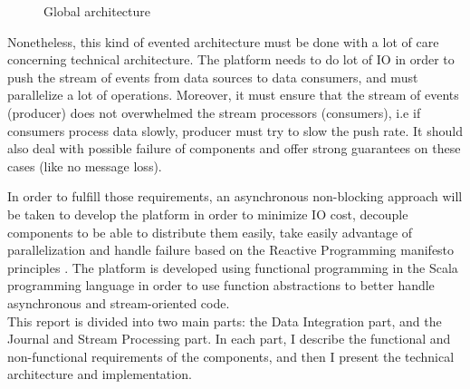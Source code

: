 \begin{figure}[h]
  \begin{center}
    \caption{Global architecture}
    \label{fig:main_archi}
  \end{center}
\end{figure}

Nonetheless, this kind of evented architecture must be done with a lot of care concerning technical architecture.
The platform needs to do lot of IO in order to push the stream of events from data sources to data consumers, and must
parallelize a lot of operations. Moreover, it must ensure that the stream of events (producer) does not overwhelmed the stream
processors (consumers), i.e if consumers process data slowly, producer must try to slow the push rate. It should also deal with possible
failure of components and offer strong guarantees on these cases (like no message loss).

In order to fulfill those requirements, an asynchronous non-blocking approach will be taken to develop the platform in order to
minimize IO cost, decouple components to be able to distribute them easily, take easily advantage of parallelization and handle failure based on the 
Reactive Programming manifesto principles . The platform is developed using functional programming in
the Scala programming language  in order to use function abstractions to better handle asynchronous and stream-oriented code.
\\

This report is divided into two main parts: the Data Integration part, and the Journal and Stream Processing part.
In each part, I describe the functional and non-functional requirements of the components, and then I present the technical architecture
and implementation.

